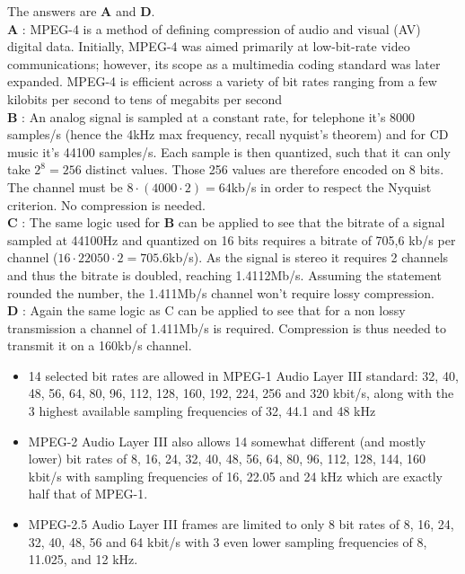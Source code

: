 \documentclass[en]{sourcefiles/eplexam}
\begin{document}
\begin{solution}
The answers are \textbf{A} and \textbf{D}.\\


\noindent \textbf{A} : MPEG-4 is a method of defining compression of audio and visual (AV) digital data. Initially, MPEG-4 was aimed primarily at low-bit-rate video communications; however, its scope as a multimedia coding standard was later expanded. MPEG-4 is efficient across a variety of bit rates ranging from a few kilobits per second to tens of megabits per second\\

\noindent \textbf{B} : An analog signal is sampled at a constant rate, for telephone it's 8000 samples/s (hence the 4kHz max frequency, recall nyquist's theorem) and for CD music it's 44100 samples/s. Each sample is then quantized, such that it can only take $2^8=256$ distinct values. Those 256 values are therefore encoded on 8 bits. The channel must be $8 \cdot (4000 \cdot 2) = 64$kb/s in order to respect the Nyquist criterion. No compression is needed.\\

\noindent \textbf{C} : The same logic used for \textbf{B} can be applied to see that the bitrate of a signal sampled at 44100Hz and quantized on 16 bits requires a bitrate of 705,6 kb/s per channel ($16 \cdot 22050 \cdot 2 = 705.6$kb/s). As the signal is stereo it requires 2 channels and thus the bitrate is doubled, reaching 1.4112Mb/s. Assuming the statement rounded the number, the 1.411Mb/s channel won't require lossy compression.\\


\noindent \textbf{D} : Again the same logic as C can be applied to see that for a non lossy transmission a channel of 1.411Mb/s is required. Compression is thus needed to transmit it on a 160kb/s channel. 
\begin{itemize}
    \item 14 selected bit rates are allowed in MPEG-1 Audio Layer III standard: 32, 40, 48, 56, 64, 80, 96, 112, 128, 160, 192, 224, 256 and 320 kbit/s, along with the 3 highest available sampling frequencies of 32, 44.1 and 48 kHz
    \item MPEG-2 Audio Layer III also allows 14 somewhat different (and mostly lower) bit rates of 8, 16, 24, 32, 40, 48, 56, 64, 80, 96, 112, 128, 144, 160 kbit/s with sampling frequencies of 16, 22.05 and 24 kHz which are exactly half that of MPEG-1.
    \item MPEG-2.5 Audio Layer III frames are limited to only 8 bit rates of 8, 16, 24, 32, 40, 48, 56 and 64 kbit/s with 3 even lower sampling frequencies of 8, 11.025, and 12 kHz.
\end{itemize}
\end{solution}
\end{document}
